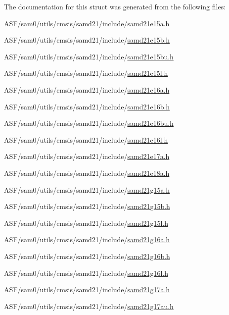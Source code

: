 The documentation for this struct was generated from the following files\+:\begin{DoxyCompactItemize}
\item 
A\+S\+F/sam0/utils/cmsis/samd21/include/\mbox{\hyperlink{samd21e15a_8h}{samd21e15a.\+h}}\item 
A\+S\+F/sam0/utils/cmsis/samd21/include/\mbox{\hyperlink{samd21e15b_8h}{samd21e15b.\+h}}\item 
A\+S\+F/sam0/utils/cmsis/samd21/include/\mbox{\hyperlink{samd21e15bu_8h}{samd21e15bu.\+h}}\item 
A\+S\+F/sam0/utils/cmsis/samd21/include/\mbox{\hyperlink{samd21e15l_8h}{samd21e15l.\+h}}\item 
A\+S\+F/sam0/utils/cmsis/samd21/include/\mbox{\hyperlink{samd21e16a_8h}{samd21e16a.\+h}}\item 
A\+S\+F/sam0/utils/cmsis/samd21/include/\mbox{\hyperlink{samd21e16b_8h}{samd21e16b.\+h}}\item 
A\+S\+F/sam0/utils/cmsis/samd21/include/\mbox{\hyperlink{samd21e16bu_8h}{samd21e16bu.\+h}}\item 
A\+S\+F/sam0/utils/cmsis/samd21/include/\mbox{\hyperlink{samd21e16l_8h}{samd21e16l.\+h}}\item 
A\+S\+F/sam0/utils/cmsis/samd21/include/\mbox{\hyperlink{samd21e17a_8h}{samd21e17a.\+h}}\item 
A\+S\+F/sam0/utils/cmsis/samd21/include/\mbox{\hyperlink{samd21e18a_8h}{samd21e18a.\+h}}\item 
A\+S\+F/sam0/utils/cmsis/samd21/include/\mbox{\hyperlink{samd21g15a_8h}{samd21g15a.\+h}}\item 
A\+S\+F/sam0/utils/cmsis/samd21/include/\mbox{\hyperlink{samd21g15b_8h}{samd21g15b.\+h}}\item 
A\+S\+F/sam0/utils/cmsis/samd21/include/\mbox{\hyperlink{samd21g15l_8h}{samd21g15l.\+h}}\item 
A\+S\+F/sam0/utils/cmsis/samd21/include/\mbox{\hyperlink{samd21g16a_8h}{samd21g16a.\+h}}\item 
A\+S\+F/sam0/utils/cmsis/samd21/include/\mbox{\hyperlink{samd21g16b_8h}{samd21g16b.\+h}}\item 
A\+S\+F/sam0/utils/cmsis/samd21/include/\mbox{\hyperlink{samd21g16l_8h}{samd21g16l.\+h}}\item 
A\+S\+F/sam0/utils/cmsis/samd21/include/\mbox{\hyperlink{samd21g17a_8h}{samd21g17a.\+h}}\item 
A\+S\+F/sam0/utils/cmsis/samd21/include/\mbox{\hyperlink{samd21g17au_8h}{samd21g17au.\+h}}\item 

\end{DoxyCompactItemize}
